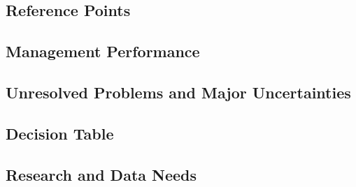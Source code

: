 \documentclass[11pt,
  english,
  a4paper,
]{article}
\begin{document}
\hypertarget{reference-points-4}{%
\subsection*{Reference Points}\label{reference-points-4}}

\leavevmode\tagmcend\tagstructend


\hypertarget{management-performance-2}{%
\subsection*{Management Performance}\label{management-performance-2}}

\leavevmode\tagmcend\tagstructend


\hypertarget{unresolved-problems-and-major-uncertainties-4}{%
\subsection*{Unresolved Problems and Major Uncertainties}\label{unresolved-problems-and-major-uncertainties-4}}

\leavevmode\tagmcend\tagstructend


\hypertarget{decision-table-2}{%
\subsection*{Decision Table}\label{decision-table-2}}

\leavevmode\tagmcend\tagstructend


\hypertarget{research-and-data-needs-3}{%
\subsection*{Research and Data Needs}\label{research-and-data-needs-3}}

\leavevmode\tagmcend\tagstructend

\end{document}
